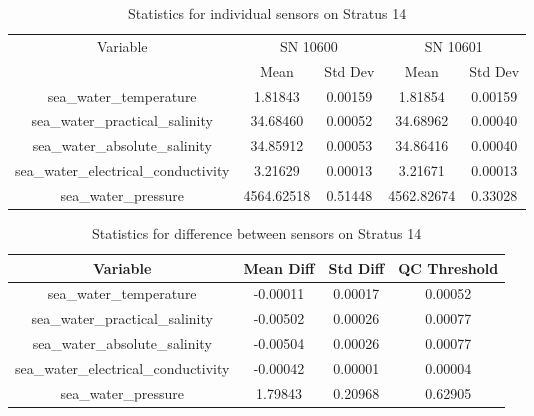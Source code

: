 \begin{table}[h]
\centering
\begin{tabular}{|c|c|c|c|c|}
\hline
Variable & \multicolumn{2}{c|}{SN 10600} & \multicolumn{2}{c|}{SN 10601} \\
& Mean & Std Dev & Mean & Std Dev \\
\hline
sea\_water\_temperature & 1.81843 & 0.00159 & 1.81854 & 0.00159 \\
sea\_water\_practical\_salinity & 34.68460 & 0.00052 & 34.68962 & 0.00040 \\
sea\_water\_absolute\_salinity & 34.85912 & 0.00053 & 34.86416 & 0.00040 \\
sea\_water\_electrical\_conductivity & 3.21629 & 0.00013 & 3.21671 & 0.00013 \\
sea\_water\_pressure & 4564.62518 & 0.51448 & 4562.82674 & 0.33028 \\
\hline
\end{tabular}
\caption{Statistics for individual sensors on Stratus 14}
\end{table}

\begin{table}[h]
\centering
\begin{tabular}{|c|c|c|c|}
\hline
Variable & Mean Diff & Std Diff & QC Threshold \\
\hline
sea\_water\_temperature & -0.00011 & 0.00017 & 0.00052 \\
sea\_water\_practical\_salinity & -0.00502 & 0.00026 & 0.00077 \\
sea\_water\_absolute\_salinity & -0.00504 & 0.00026 & 0.00077 \\
sea\_water\_electrical\_conductivity & -0.00042 & 0.00001 & 0.00004 \\
sea\_water\_pressure & 1.79843 & 0.20968 & 0.62905 \\
\hline
\end{tabular}
\caption{Statistics for difference between sensors on Stratus 14}
\end{table}
